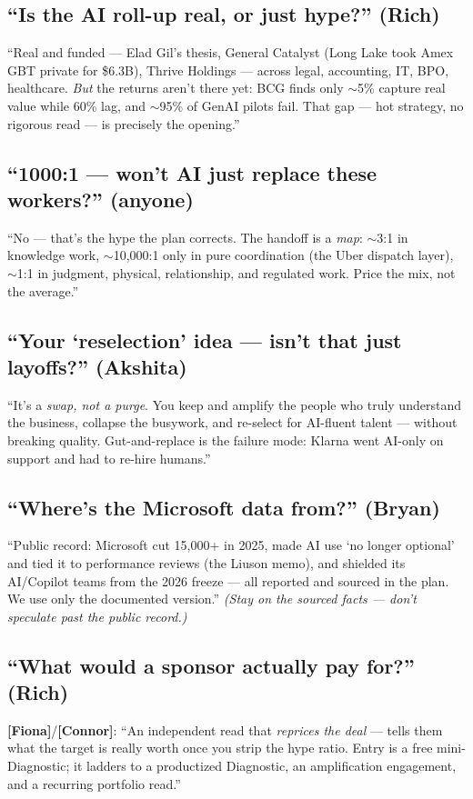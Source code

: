 \documentclass[11pt]{article}
\newcommand{\F}{\textcolor{creoaccent}{\textbf{[Fiona]}}}
\newcommand{\C}{\textcolor{creonavy}{\textbf{[Connor]}}}
\begin{document}
\subsection{``Is the AI roll-up real, or just hype?'' \textnormal{(Rich)}}
``Real and funded --- Elad Gil's thesis, General Catalyst (Long Lake took Amex GBT private for
\$6.3B), Thrive Holdings --- across legal, accounting, IT, BPO, healthcare. \emph{But} the
returns aren't there yet: BCG finds only $\sim$5\% capture real value while 60\% lag, and
$\sim$95\% of GenAI pilots fail. That gap --- hot strategy, no rigorous read --- is precisely the
opening.''

\subsection{``1000:1 --- won't AI just replace these workers?'' \textnormal{(anyone)}}
``No --- that's the hype the plan corrects. The handoff is a \emph{map}: $\sim$3:1 in knowledge
work, $\sim$10{,}000:1 only in pure coordination (the Uber dispatch layer), $\sim$1:1 in
judgment, physical, relationship, and regulated work. Price the mix, not the average.''

\subsection{``Your `reselection' idea --- isn't that just layoffs?'' \textnormal{(Akshita)}}
``It's a \emph{swap, not a purge}. You keep and amplify the people who truly understand the
business, collapse the busywork, and re-select for AI-fluent talent --- without breaking quality.
Gut-and-replace is the failure mode: Klarna went AI-only on support and had to re-hire humans.''

\subsection{``Where's the Microsoft data from?'' \textnormal{(Bryan)}}
``Public record: Microsoft cut 15{,}000+ in 2025, made AI use `no longer optional' and tied it to
performance reviews (the Liuson memo), and shielded its AI/Copilot teams from the 2026 freeze ---
all reported and sourced in the plan. We use only the documented version.'' \emph{(Stay on the
sourced facts --- don't speculate past the public record.)}

\subsection{``What would a sponsor actually pay for?'' \textnormal{(Rich)}}
\F/\C: ``An independent read that \emph{reprices the deal} --- tells them what the target is
really worth once you strip the hype ratio. Entry is a free mini-Diagnostic; it ladders to a
productized Diagnostic, an amplification engagement, and a recurring portfolio read.''
\end{document}
